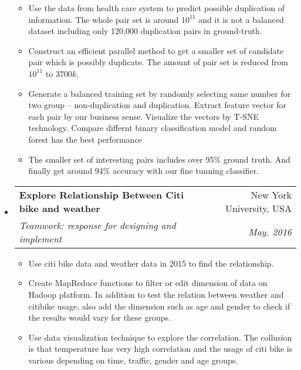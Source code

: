 \documentclass[a4paper,10pt]{article}
\makeatletter
\newcommand{\resitem}[1]{\item #1 \vspace{-2pt}}
\renewcommand{\normalsize}{\fontsize{12pt}{\baselineskip}\selectfont}
\newcommand{\ressubheading}[4]{
	\begin{tabular*}{6.5in}{l@{\extracolsep{\fill}}r}
		\textbf{#1} & #2 \\
		\textit{#3} & \textit{#4} \\
	\end{tabular*}\vspace{-6pt}}
\makeatother
\begin{document}
\begin{itemize}
			\begin{itemize}
				\resitem{Use the data from health care system to predict possible duplication of information. The whole pair set is around $ 10^{11} $ and it is not a balanced dataset including only 120,000 duplication pairs in ground-truth.}
				\resitem{Construct an efficient parallel method to get a smaller set of candidate pair which is possibly duplicate. The amount of pair set is reduced from $ 10^{11} $ to $ 3700k $.}
				\resitem{Generate a balanced training set by randomly selecting same number for two group -- non-duplication and duplication. Extract feature vector for each pair by our business sense. Visualize the vectors by T-SNE technology. Compare differnt binary classification model and random forest has the best performance}
				\resitem{The smaller set of interesting pairs includes over 95\% ground truth. And finally get around 94\% accuracy with our fine tunning classifier.} 
			\end{itemize}
		\item \ressubheading{\normalsize Explore Relationship Between Citi bike and weather}{New York University, USA}{\normalsize Teamwork: response for designing and implement}{May. 2016}
		\begin{itemize}
			\resitem{Use citi bike data and weather data in 2015 to find the relationship.}
			\resitem{Create MapReduce functions to filter or edit dimension of data on Hadoop platform. In addition to test the relation between weather and citibike usage, also add the dimension such as age and gender to check if the results would vary for these groups.}
			\resitem{Use data visualization technique to explore the correlation. The collusion is that temperature has very high correlation and the usage of citi bike is various depending on time, traffic, gender and age groups.}
		\end{itemize}
%			
			

\end{itemize}
\end{document}
